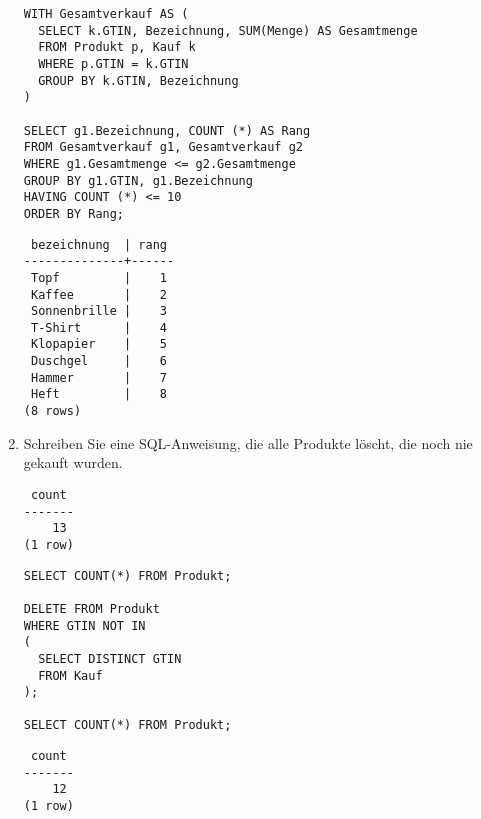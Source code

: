 \documentclass{bschlangaul-aufgabe}
\begin{document}
\begin{enumerate}
\begin{liAntwort}
\begin{verbatim}
WITH Gesamtverkauf AS (
  SELECT k.GTIN, Bezeichnung, SUM(Menge) AS Gesamtmenge
  FROM Produkt p, Kauf k
  WHERE p.GTIN = k.GTIN
  GROUP BY k.GTIN, Bezeichnung
)

SELECT g1.Bezeichnung, COUNT (*) AS Rang
FROM Gesamtverkauf g1, Gesamtverkauf g2
WHERE g1.Gesamtmenge <= g2.Gesamtmenge
GROUP BY g1.GTIN, g1.Bezeichnung
HAVING COUNT (*) <= 10
ORDER BY Rang;
\end{verbatim}

\begin{verbatim}
 bezeichnung  | rang
--------------+------
 Topf         |    1
 Kaffee       |    2
 Sonnenbrille |    3
 T-Shirt      |    4
 Klopapier    |    5
 Duschgel     |    6
 Hammer       |    7
 Heft         |    8
(8 rows)
\end{verbatim}
\end{liAntwort}


\item Schreiben Sie eine SQL-Anweisung, die alle Produkte löscht, die
noch nie gekauft wurden.

\begin{liAntwort}
\begin{verbatim}
 count
-------
    13
(1 row)
\end{verbatim}

\begin{verbatim}
SELECT COUNT(*) FROM Produkt;

DELETE FROM Produkt
WHERE GTIN NOT IN
(
  SELECT DISTINCT GTIN
  FROM Kauf
);

SELECT COUNT(*) FROM Produkt;
\end{verbatim}

\begin{verbatim}
 count
-------
    12
(1 row)
\end{verbatim}
\end{liAntwort}
\end{enumerate}
\end{document}
